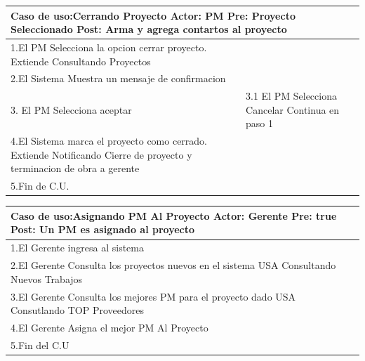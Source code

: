 \begin{longtable}{|p{}|p{}|}
    \hline
    \multicolumn{2}{|p{16cm}|}{
        \textbf{Caso de uso:}Cerrando Proyecto \newline
        \textbf{Actor:} PM\newline
        \textbf{Pre: }Proyecto Seleccionado\newline
        \textbf{Post:} Arma y agrega contartos al proyecto
    }\\
    \hline
    1.El PM Selecciona la opcion cerrar proyecto. Extiende Consultando Proyectos & \\
    \hline
    2.El Sistema Muestra un mensaje de confirmacion& \\
    \hline
    3. El PM Selecciona aceptar & 3.1 El PM Selecciona Cancelar \newline 3.2 Continua en paso 1\\
    \hline
    4.El Sistema marca el proyecto como cerrado. Extiende Notificando Cierre de proyecto y terminacion de obra a gerente &\\
    \hline
    5.Fin de C.U. &\\
    \hline
\end{longtable}


\begin{longtable}{|p{}|p{}|}
    \hline
    \multicolumn{2}{|p{16cm}|}{
        \textbf{Caso de uso:}Asignando PM Al Proyecto\newline
        \textbf{Actor:} Gerente\newline
        \textbf{Pre: }true\newline
        \textbf{Post:} Un PM es asignado al proyecto
    }\\
    \hline
    1.El Gerente ingresa al sistema & \\
    \hline
    2.El Gerente Consulta los proyectos nuevos en el sistema USA Consultando Nuevos Trabajos&    \\
    \hline
    3.El Gerente Consulta los mejores PM para el proyecto dado USA Consutlando TOP Proveedores& \\
    \hline
    4.El Gerente Asigna el mejor PM Al Proyecto&\\
    \hline
    5.Fin del C.U&\\
    \hline
\end{longtable}



